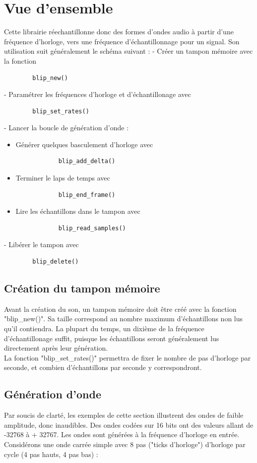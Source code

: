 \documentclass[french]{report}
\begin{document}
\section*{Vue d'ensemble}
Cette librairie réechantillonne donc des formes d'ondes audio à partir d'une fréquence d'horloge, vers une fréquence d'échantillonnage pour un signal.
Son utilisation suit généralement le schéma suivant :
- Créer un tampon mémoire avec la fonction 
\begin{lstlisting} 
		blip_new() 
\end{lstlisting}
- Paramétrer les fréquences d'horloge et d'échantillonage avec 
\begin{lstlisting} 
		blip_set_rates() 
\end{lstlisting}
- Lancer la boucle de génération d'onde :
\begin{itemize}
	\item Générer quelques basculement d'horloge avec 
	\begin{lstlisting}
			blip_add_delta()
	\end{lstlisting}
	\item Terminer le laps de temps avec 
	\begin{lstlisting}
			blip_end_frame()
	\end{lstlisting}
	\item Lire les échantillons dans le tampon avec 
	\begin{lstlisting}
			blip_read_samples()
	\end{lstlisting}
\end{itemize}
- Libérer le tampon avec 
\begin{lstlisting}
		blip_delete()
\end{lstlisting}

\subsection{Création du tampon mémoire}
Avant la création du son, un tampon mémoire doit être créé avec la fonction  "blip\_new()". Sa taille correspond au nombre maximum d'échantillons non lus qu'il contiendra. La plupart du temps, un dixième de la fréquence d'échantillonage suffit, puisque les échantillons seront généralement lus directement après leur génération.\\
La fonction "blip\_set\_rates()" permettra de fixer le nombre de pas d'horloge par seconde, et combien d'échantillons par seconde y correspondront. 
\subsection{Génération d'onde}
Par soucis de clarté, les exemples de cette section illustrent des ondes de faible amplitude, donc inaudibles. Des ondes codées sur 16 bits ont des valeurs allant de -32768 à + 32767.
Les ondes sont générées à la fréquence d'horloge en entrée.
Considérons une onde carrée simple avec 8 pas ("ticks d'horloge") d'horloge par cycle (4 pas hauts, 4 pas bas) : 
\end{document}

